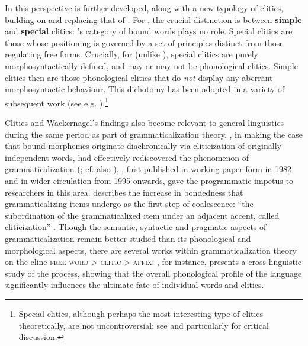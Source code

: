 In \citet{Anderson2005} this perspective is further developed, along with a new typology of clitics, building on and replacing that of \citet{Zwicky1977}. For \citeauthor{Anderson2005}, the crucial distinction is between \textbf{simple} and \textbf{special} clitics: \citeauthor{Zwicky1977}'s category of bound words plays no role. Special clitics are those whose positioning is governed by a set of principles distinct from those regulating free forms. Crucially, for \citeauthor{Anderson2005} (unlike \citeauthor{Zwicky1977}), special clitics are purely morphosyntactically defined, and may or may not be phonological clitics. Simple clitics then are those phonological clitics that do \emph{not} display any aberrant morphosyntactic behaviour. This dichotomy has been adopted in a variety of subsequent work (see e.g. \citealp[95]{Boegel2015}).\footnote{Special clitics, although perhaps the most interesting type of clitics theoretically, are not uncontroversial: see \citet{SpencerLuis2012} and particularly \citet{BermudezOteroPayne2011} for critical discussion.}

Clitics and Wackernagel's findings also become relevant to general linguistics during the same period as part of grammaticalization theory. \citet{Givon1971}, in making the case that bound morphemes originate diachronically via cliticization of originally independent words, had effectively rediscovered the phenomenon of grammaticalization (\citealp{Meillet1912}; cf. also \citealp{Kurylowicz1965}). \citet{Lehmann2015}, first published in working-paper form in 1982 and in wider circulation from 1995 onwards, gave the programmatic impetus to researchers in this area. \citeauthor{Lehmann2015} describes the increase in bondedness that grammaticalizing items undergo as the first step of coalescence: ``the subordination of the grammaticalized item under an adjacent accent, called cliticization'' \citep[157]{Lehmann2015}. Though the semantic, syntactic and pragmatic aspects of grammaticalization remain better studied than its phonological and morphological aspects, there are several works within grammaticalization theory on the cline \textsc{free word} > \textsc{clitic} > \textsc{affix}: \citet{Schiering2006,Schiering2010}, for instance, presents a cross-linguistic study of the process, showing that the overall phonological profile of the language significantly influences the ultimate fate of individual words and clitics.

